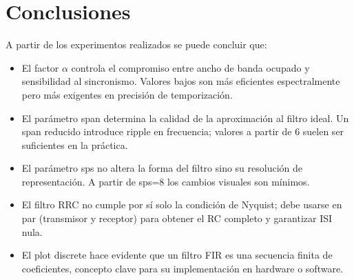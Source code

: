 \documentclass[12pt, a4paper]{article}
\begin{document}
\section{Conclusiones}

A partir de los experimentos realizados se puede concluir que:

\begin{itemize}
    \item El factor $\alpha$ controla el compromiso entre ancho de banda ocupado
    y sensibilidad al sincronismo. Valores bajos son más eficientes espectralmente
    pero más exigentes en precisión de temporización.
    \item El parámetro span determina la calidad de la aproximación al filtro ideal.
    Un span reducido introduce ripple en frecuencia; valores a partir de 6 suelen
    ser suficientes en la práctica.
    \item El parámetro sps no altera la forma del filtro sino su resolución de
    representación. A partir de sps=8 los cambios visuales son mínimos.
    \item El filtro RRC no cumple por sí solo la condición de Nyquist; debe
    usarse en par (transmisor y receptor) para obtener el RC completo y garantizar
    ISI nula.
    \item El plot discrete hace evidente que un filtro FIR es una secuencia finita
    de coeficientes, concepto clave para su implementación en hardware o software.
\end{itemize}
\end{document}
